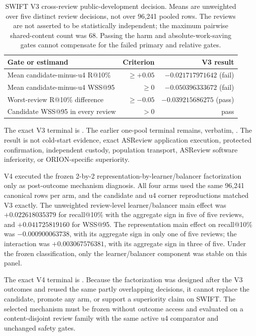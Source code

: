 \begin{table}[H]
\centering
\small
\begin{tabular}{lrr}
\hline
Gate or estimand & Criterion & V3 result \\
\hline
Mean candidate-minus-u4 R@10\% & $\ge +0.05$ & $-0.021717971642$ (fail) \\
Mean candidate-minus-u4 WSS@95 & $\ge 0$ & $-0.050396333672$ (fail) \\
Worst-review R@10\% difference & $\ge -0.05$ & $-0.039215686275$ (pass) \\
Candidate WSS@95 in every review & $>0$ & pass \\
\hline
\end{tabular}
\caption{SWIFT V3 cross-review public-development decision.  Means are
unweighted over five distinct review decisions, not over 96,241 pooled rows.
The reviews are not asserted to be statistically independent; the maximum
pairwise shared-content count was 68.  Passing the harm and absolute-work-saving
gates cannot compensate for the failed primary and relative gates.}
\label{tab:p2-swift-v3}
\end{table}

The exact V3 terminal is
.
The earlier one-pool terminal remains, verbatim,
.
The result is not cold-start evidence, exact ASReview application execution,
protected confirmation, independent custody, population transport, ASReview
software inferiority, or ORION-specific superiority.

V4 executed the frozen 2-by-2 representation-by-learner/balancer factorization
only as post-outcome mechanism diagnosis.  All four arms used the same 96,241
canonical rows per arm, and the candidate and u4 corner reproductions matched
V3 exactly.  The unweighted review-level learner/balancer main effect was
$+0.022618035379$ for recall@10\% with the aggregate sign in five of five
reviews, and $+0.041725819160$ for WSS@95.  The representation main effect on
recall@10\% was $-0.000900063738$, with its aggregate sign in only one of five
reviews; the interaction was $+0.003067576381$, with its aggregate sign in
three of five.  Under the frozen classification, only the learner/balancer
component was stable on this panel.

The exact V4 terminal is
.
Because the factorization was designed after the V3 outcomes and reused the
same partly overlapping decisions, it cannot replace the candidate, promote
any arm, or support a superiority claim on SWIFT.  The selected mechanism must
be frozen without outcome access and evaluated on a content-disjoint review
family with the same active u4 comparator and unchanged safety gates.

